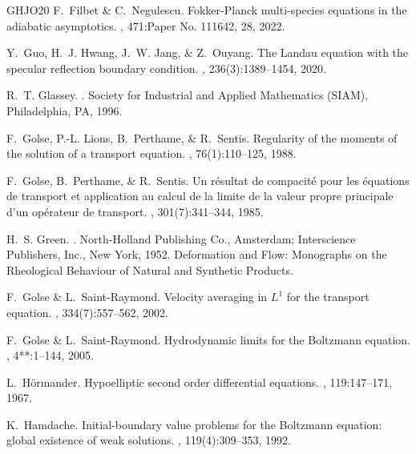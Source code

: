 \documentclass[10pt, reqno]{amsart}
\theoremstyle{plain}
\theoremstyle{definition}
\theoremstyle{remark}
\numberwithin{equation}{section}
\begin{document}
\begin{thebibliography}{GHJO20}
{\sc F.~Filbet \& C.~Negulescu.}
\newblock Fokker-{P}lanck multi-species equations in the adiabatic asymptotics.
, 471:Paper No. 111642, 28, 2022.

{\sc Y.~Guo, H.~J. Hwang, J.~W. Jang, \& Z.~Ouyang.}
\newblock The {L}andau equation with the specular reflection boundary condition.
, 236(3):1389--1454, 2020.

{\sc R.~T. Glassey.}
.
\newblock Society for Industrial and Applied Mathematics (SIAM), Philadelphia, PA, 1996.

{\sc F.~Golse, P.-L. Lions, B.~Perthame, \& R.~Sentis.}
\newblock Regularity of the moments of the solution of a transport equation.
, 76(1):110--125, 1988.

{\sc F.~Golse, B.~Perthame, \& R.~Sentis.}
\newblock Un r\'{e}sultat de compacit\'{e} pour les \'{e}quations de transport et application au calcul de la limite de la valeur propre principale d'un op\'{e}rateur de transport.
, 301(7):341--344, 1985.

{\sc H.~S. Green.}
.
\newblock North-Holland Publishing Co., Amsterdam; Interscience Publishers, Inc., New York, 1952.
\newblock Deformation and Flow: Monographs on the Rheological Behaviour of Natural and Synthetic Products.

{\sc F.~Golse \& L.~Saint-Raymond.}
\newblock Velocity averaging in {$L^1$} for the transport equation.
, 334(7):557--562, 2002.

{\sc F.~Golse \& L.~Saint-Raymond.}
\newblock Hydrodynamic limits for the {B}oltzmann equation.
, 4**:1--144, 2005.

{\sc L.~H\"{o}rmander.}
\newblock Hypoelliptic second order differential equations.
, 119:147--171, 1967.

{\sc K.~Hamdache.}
\newblock Initial-boundary value problems for the {B}oltzmann equation: global existence of weak solutions.
, 119(4):309--353, 1992.


\end{thebibliography}
\end{document}
